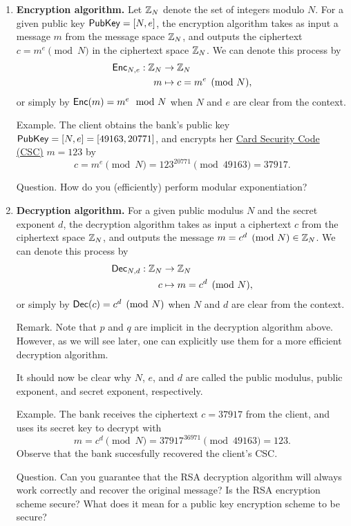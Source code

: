 \begin{enumerate}
    \item {\bf Encryption algorithm.} Let $\mathbb{Z}_N$ denote the set of integers modulo $N$. 
    For a given public key ${\sf PubKey} = [N, e]$, the encryption algorithm takes as input a message 
    $m$ from the message space $\mathbb{Z}_N$, and outputs the ciphertext $c = m^e \pmod N$ in the 
    ciphertext space $\mathbb{Z}_N$. We can denote this process by 
    \begin{align*}
        {\sf Enc}_{N,e} : \mathbb{Z}_N &\to \mathbb{Z}_N \\
        m &\mapsto c = m^e \pmod N,
    \end{align*}
    or simply by ${\sf Enc}(m) = m^e \mod N$ when $N$ and $e$ are clear from the context.
    
    {\sc Example.} The client obtains the bank’s public key ${\sf PubKey} = [N,e] = [49163,20771]$, 
    and encrypts her \href{https://en.wikipedia.org/wiki/Card_security_code}{Card Security Code (CSC)} $m=123$ by 
    \[ c = m^e \pmod N = 123^{20771} \pmod {49163} = 37917. \]
    
    {\sc Question.} How do you (efficiently) perform modular exponentiation?
    
    \item {\bf Decryption algorithm.} For a given public modulus $N$ and the secret exponent $d$, the decryption algorithm takes as input a ciphertext $c$ from the ciphertext space $\mathbb{Z}_N$, 
    and outputs the message $m = c^d \pmod N \in \mathbb{Z}_N$. We can denote this process by 
    \begin{align*}
        {\sf Dec}_{N,d} : \mathbb{Z}_N &\to \mathbb{Z}_N \\
        c &\mapsto m = c^d \pmod N,
    \end{align*}
    or simply by ${\sf Dec}(c) = c^d \pmod N$ when $N$ and $d$ are clear from the context.
    
    {\sc Remark.} Note that $p$ and $q$ are implicit in the decryption algorithm above. However, as we will see later, one can explicitly use them for a more efficient decryption algorithm.
    
    It should now be clear why $N$, $e$, and $d$ are called the public modulus, public exponent, and secret exponent, respectively.
    
    {\sc Example.} The bank receives the ciphertext $c=37917$ from the client, and uses its secret key to decrypt with 
    \[ m = c^d \pmod N = 37917^{36971} \pmod {49163} = 123. \]
    Observe that the bank succesfully recovered the client's CSC. 
    
    {\sc Question.} Can you guarantee that the RSA decryption algorithm will always work correctly and recover the original message? Is the RSA encryption scheme secure? What does it mean for a public key encryption scheme to be secure?
\end{enumerate}